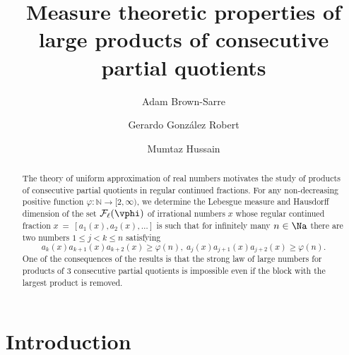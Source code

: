 \documentclass[12pt,a4paper]{amsart}
\begin{document}
\title[Measure theoretic properties of large products]{Measure theoretic properties of large products of consecutive partial quotients}
\author[Brown-Sarre]{Adam Brown-Sarre}
\author[Gonz\'alez Robert]{Gerardo Gonz\'alez Robert}
\author[Hussain]{Mumtaz Hussain}
\address{Department of Mathematical and Physical Sciences,  La Trobe University, Bendigo 3552, Australia. }

\begin{abstract}
The theory of uniform approximation of real numbers motivates the study of products of consecutive partial quotients in regular continued fractions. For any non-decreasing positive function $\varphi:\mathbb{N}\to [2,\infty)$, we determine the Lebesgue measure and Hausdorff dimension of the set $\mathcal{F}_{\ell}(\vphi)$ of irrational numbers $x$ whose regular continued fraction $x~=~[a_1(x),a_2(x),\ldots]$ is such that for infinitely many $n\in\Na$ there are two numbers $1\leq j<k \leq n$ satisfying
\[
a_{k}(x)a_{k+1}(x)a_{k+2}(x) \geq \varphi(n), \;
a_{j}(x)a_{j+1}(x)a_{j+2}(x) \geq \varphi(n). 
\]
One of the consequences of the results is that the strong law of large numbers for products of $3$ consecutive partial quotients is impossible even if the block with the largest product is removed.
\end{abstract}
\maketitle

\section{Introduction}
\end{document}
